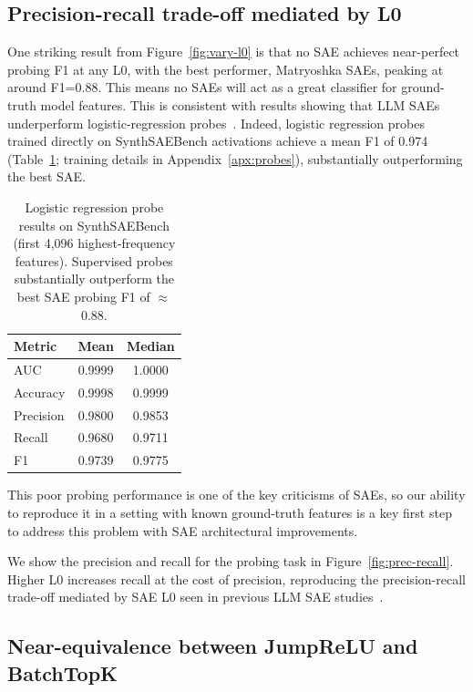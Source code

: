 \documentclass{article}
\theoremstyle{plain}
\theoremstyle{definition}
\theoremstyle{remark}
\begin{document}
\subsection{Precision-recall trade-off mediated by L0}
\label{sec:prec-recall}

One striking result from Figure~\ref{fig:vary-l0} is that no SAE achieves near-perfect probing F1 at any L0, with the best performer, Matryoshka SAEs, peaking at around F1=0.88. This means no SAEs will act as a great classifier for ground-truth model features. This is consistent with results showing that LLM SAEs underperform logistic-regression probes~\citep{kantamneni2025sparse}. Indeed, logistic regression probes trained directly on SynthSAEBench activations achieve a mean F1 of 0.974 (Table~\ref{tab:probe-results}; training details in Appendix~\ref{apx:probes}), substantially outperforming the best SAE.

\begin{table}[ht]
\centering
\caption{Logistic regression probe results on SynthSAEBench (first 4,096 highest-frequency features). Supervised probes substantially outperform the best SAE probing F1 of $\approx$0.88.}
\label{tab:probe-results}
\begin{tabular}{lcc}
\toprule
Metric & Mean & Median \\
\midrule
AUC       & 0.9999 & 1.0000 \\
Accuracy  & 0.9998 & 0.9999 \\
Precision & 0.9800 & 0.9853 \\
Recall    & 0.9680 & 0.9711 \\
F1        & 0.9739 & 0.9775 \\
\bottomrule
\end{tabular}
\end{table} This poor probing performance is one of the key criticisms of SAEs, so our ability to reproduce it in a setting with known ground-truth features is a key first step to address this problem with SAE architectural improvements.

We show the precision and recall for the probing task in Figure~\ref{fig:prec-recall}. Higher L0 increases recall at the cost of precision, reproducing the precision-recall trade-off mediated by SAE L0 seen in previous LLM SAE studies~\citep{karvonen2025saebenchcomprehensivebenchmarksparse,chanin2025a}.

\subsection{Near-equivalence between JumpReLU and BatchTopK}
\end{document}
